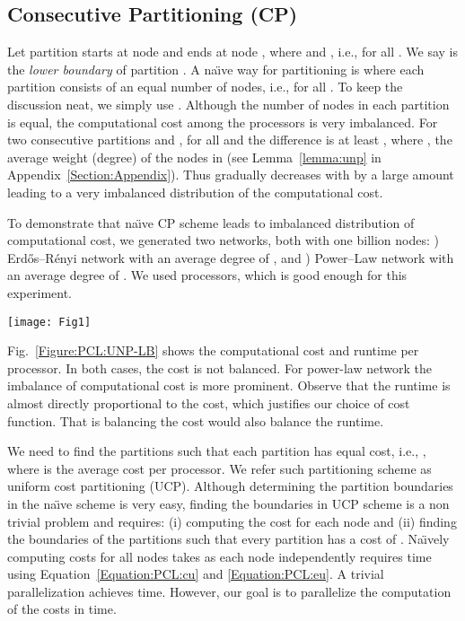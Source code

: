 \documentclass[conference,letterpaper,10pt]{IEEEtran}
\newcommand{\Figure}{Fig.\xspace}
\begin{document}
\subsection{Consecutive Partitioning (CP)}
\label{Section:PCL:consecutive-partitioning}
Let partition  starts at node  and ends at node , where  and , i.e.,  for all . We say  is the \textit{lower boundary} of partition .  
A na\"{\i}ve way for partitioning  is where each partition consists of an equal number of nodes, i.e.,  for all . To keep the discussion neat, we simply use . 
Although the number of nodes in each partition is equal, the computational cost among the processors is very imbalanced. For two consecutive partitions  and ,  for all  and the difference is at least , where , the average weight (degree) of the nodes in  (see  Lemma~\ref{lemma:unp} in Appendix~\ref{Section:Appendix}). Thus  gradually decreases with  by a large amount leading to a very imbalanced distribution of the computational cost. 

To demonstrate that na\"{\i}ve CP scheme leads to imbalanced distribution of computational cost, we generated two networks, both with one billion nodes: ) Erd\H{o}s--R\'enyi network with an average degree of , and ) Power--Law network with an average degree of . We used  processors, which is good enough for this experiment.
\begin{figure*}[t]
\centering
{\texttt{[image: Fig1]}}
\caption{Computational cost and runtime in na\"{\i}ve CP scheme}
\label{Figure:PCL:UNP-LB}
\end{figure*}
\Figure~\ref{Figure:PCL:UNP-LB} shows the computational cost and runtime per processor. In both cases, the cost is not balanced. For power-law network the imbalance of computational cost is more prominent. Observe that the runtime is almost directly proportional to the cost, which justifies our choice of cost function. That is balancing the cost would also balance the runtime.

We need to find the partitions  such that each partition has equal cost, i.e.,  , where  is the average cost per processor. We refer such partitioning scheme as uniform cost partitioning (UCP).
Although determining the partition boundaries in the na\"{\i}ve scheme is very easy, finding the boundaries in UCP scheme is a non trivial problem and requires: (i) computing the cost  for each node  and (ii) finding the boundaries of the partitions such that every partition has a cost of . 
Na\"{\i}vely computing costs for all nodes takes  as each node independently requires  time using Equation~\ref{Equation:PCL:cu} and \ref{Equation:PCL:eu}. A trivial parallelization achieves  time. 
However, our goal is to parallelize the computation of the costs in  time.
\end{document}
